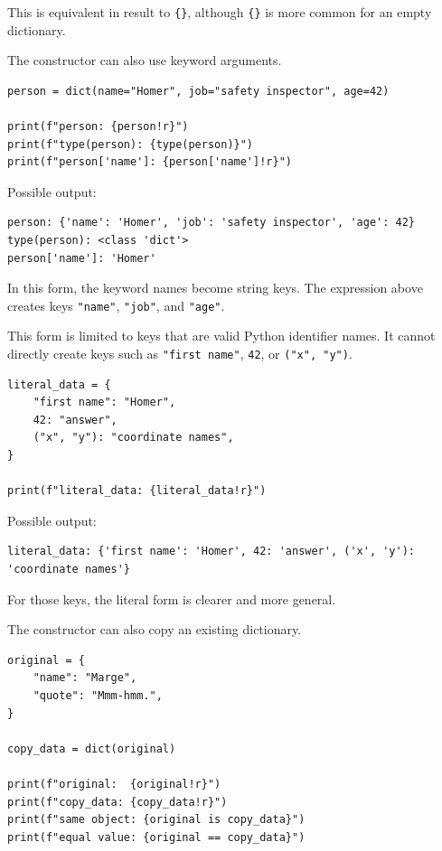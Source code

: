 This is equivalent in result to \texttt{\{\}}, although \texttt{\{\}} is more common for an empty dictionary.

The constructor can also use keyword arguments.

\begin{verbatim}
person = dict(name="Homer", job="safety inspector", age=42)

print(f"person: {person!r}")
print(f"type(person): {type(person)}")
print(f"person['name']: {person['name']!r}")
\end{verbatim}

Possible output:

\begin{verbatim}
person: {'name': 'Homer', 'job': 'safety inspector', 'age': 42}
type(person): <class 'dict'>
person['name']: 'Homer'
\end{verbatim}

In this form, the keyword names become string keys. The expression above creates keys \texttt{"name"}, \texttt{"job"}, and \texttt{"age"}.

This form is limited to keys that are valid Python identifier names. It cannot directly create keys such as \texttt{"first name"}, \texttt{42}, or \texttt{("x", "y")}.

\begin{verbatim}
literal_data = {
    "first name": "Homer",
    42: "answer",
    ("x", "y"): "coordinate names",
}

print(f"literal_data: {literal_data!r}")
\end{verbatim}

Possible output:

\begin{verbatim}
literal_data: {'first name': 'Homer', 42: 'answer', ('x', 'y'): 'coordinate names'}
\end{verbatim}

For those keys, the literal form is clearer and more general.

The constructor can also copy an existing dictionary.

\begin{verbatim}
original = {
    "name": "Marge",
    "quote": "Mmm-hmm.",
}

copy_data = dict(original)

print(f"original:  {original!r}")
print(f"copy_data: {copy_data!r}")
print(f"same object: {original is copy_data}")
print(f"equal value: {original == copy_data}")
\end{verbatim}

